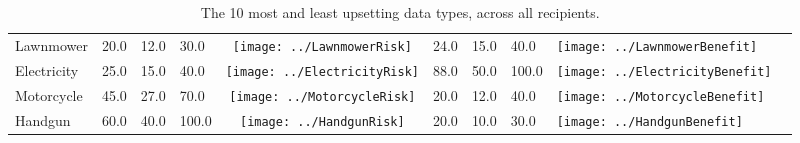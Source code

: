 \begin{table}[t]
\begin{center}
\begin{tabular}{| p{2cm} | p{1cm} | p{1cm} | p{1cm} | c | p{2cm} | p{1cm} | p{1cm} | p{1cm} | c |}
Lawnmower & 20.0 & 12.0 & 30.0 & \texttt{[image: ../LawnmowerRisk]} & 24.0 & 15.0 & 40.0 & \texttt{[image: ../LawnmowerBenefit]} \\ 
Electricity & 25.0 & 15.0 & 40.0 & \texttt{[image: ../ElectricityRisk]} & 88.0 & 50.0 & 100.0 & \texttt{[image: ../ElectricityBenefit]} \\ 

Motorcycle & 45.0 & 27.0 & 70.0 & \texttt{[image: ../MotorcycleRisk]}  & 20.0 & 12.0 & 40.0 & \texttt{[image: ../MotorcycleBenefit]} \\ 
Handgun & 60.0 & 40.0 & 100.0 & \texttt{[image: ../HandgunRisk]} & 20.0 & 10.0 & 30.0 & \texttt{[image: ../HandgunBenefit]} \\ 


\hline
\end{tabular}
\caption{The 10 most and least upsetting data types, across all recipients.}
\label{top10}
\end{center}
\end{table}
